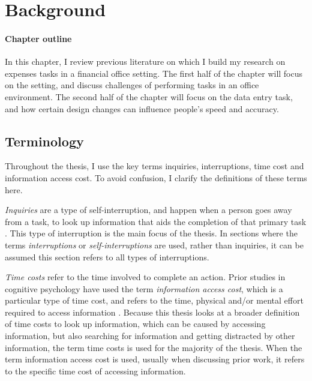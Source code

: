 \chapter{Background}\label{ch:Background}

\begin{mynote}
\subsubsection{Chapter outline}
In this chapter, I review previous literature on which I build my research on expenses tasks in a financial office setting. The first half of the chapter will focus on the setting, and discuss challenges of performing tasks in an office environment. The second half of the chapter will focus on the data entry task, and how certain design changes can influence people's speed and accuracy. 
\end{mynote}

\section{Terminology}
Throughout the thesis, I use the key terms inquiries, interruptions, time cost and information access cost. To avoid confusion, I clarify the definitions of these terms here.

\textit{Inquiries} are a type of self-interruption, and happen when a person goes away from a task, to look up information that aids the completion of that primary task \citep{Jin2009}. This type of interruption is the main focus of the thesis. In sections where the terms \textit{interruptions} or \textit{self-interruptions} are used, rather than inquiries, it can be assumed this section refers to all types of interruptions. 

\textit{Time costs} refer to the time involved to complete an action. Prior studies in cognitive psychology have used the term \textit{information access cost}, which  is a particular type of time cost, and refers to the time, physical and/or mental effort required to access information \citep{Gray2006}. Because this thesis looks at a broader definition of time costs to look up information, which can be caused by accessing information, but also searching for information and getting distracted by other information, the term time costs is used for the majority of the thesis. When the term information access cost is used, usually when discussing prior work, it refers to the specific time cost of accessing information. 

